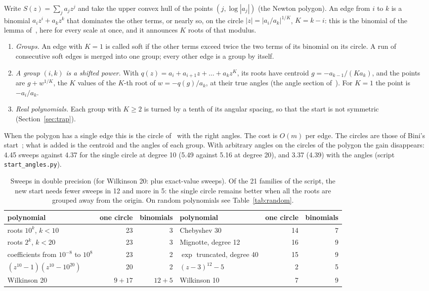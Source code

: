 \documentclass[10pt,a4paper]{article}
\theoremstyle{definition}
\numberwithin{equation}{section}
\begin{document}
Write $S(z)=\sum_ja_jz^j$ and take the upper convex hull of the points $(j,\log|a_j|)$ (the Newton
polygon). An edge from $i$ to $k$ is a binomial $a_iz^i+a_kz^k$ that dominates the other terms, or
nearly so, on the circle $|z|=|a_i/a_k|^{1/K}$, $K=k-i$: this is the binomial of the lemma
of~\cite{g3}, here for every scale at once, and it announces $K$ roots of that modulus.
\begin{enumerate}
\item \emph{Groups.} An edge with $K=1$ is called soft if the other terms exceed twice the two terms
 of its binomial on its circle. A run of consecutive soft edges is merged into one group; every other
 edge is a group by itself.
\item \emph{A group $(i,k)$ is a shifted power.} With $q(z)=a_i+a_{i+1}z+\dots+a_kz^{K}$, its roots
 have centroid $g=-a_{k-1}/(Ka_k)$, and the points are $g+w^{1/K}$, the $K$ values of the $K$-th root
 of $w=-q(g)/a_k$, at their true angles (the angle section of~\cite{c5}). For $K=1$ the point is
 $-a_i/a_k$.
\item \emph{Real polynomials.} Each group with $K\ge2$ is turned by a tenth of its angular spacing,
 so that the start is not symmetric (Section~\ref{sec:trap}).
\end{enumerate}
When the polygon has a single edge this is the circle of~\cite{g7} with the right angles. The cost is
$O(m)$ per edge. The circles are those of Bini's start~\cite{bini}; what is added is the centroid and
the angles of each group. With arbitrary angles on the circles of the polygon the gain disappears:
4.45 sweeps against 4.37 for the single circle at degree 10 (5.49 against 5.16 at degree 20), and
3.37 (4.39) with the angles (script \texttt{start\_angles.py}).

\begin{table}[H]\centering\small
\begin{tabular}{lrr@{\qquad}lrr}
\toprule
polynomial & one circle & binomials & polynomial & one circle & binomials\\
\midrule
roots $10^k$, $k<10$ & 23 & 3 & Chebyshev 30 & 14 & 7\\
roots $2^k$, $k<20$ & 23 & 3 & Mignotte, degree 12 & 16 & 9\\
coefficients from $10^{-8}$ to $10^{8}$ & 23 & 2 & $\exp$ truncated, degree 40 & 15 & 9\\
$(z^{10}-1)(z^{10}-10^{20})$ & 20 & 2 & $(z-3)^{12}-5$ & 2 & 5\\
Wilkinson 20 & $9+17$ & $12+5$ & Wilkinson 10 & 7 & 9\\
\bottomrule
\end{tabular}
\caption{Sweeps in double precision (for Wilkinson 20: plus exact-value sweeps). Of the 21 families of
the script, the new start needs fewer sweeps in 12 and more in 5: the single circle remains better when
all the roots are grouped away from the origin. On random polynomials see Table~\ref{tab:random}.}
\end{table}
\end{document}
